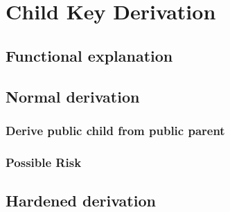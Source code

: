 
\chapter{Child Key Derivation} %

\label{bip32} %




\section{Functional explanation}

\section{Normal derivation}

\subsection{Derive public child from public parent}

\subsection{Possible Risk}

\section{Hardened derivation}
